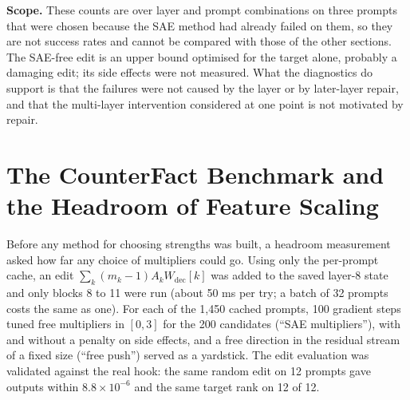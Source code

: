 \documentclass[12pt,a4paper]{report}
\begin{document}
\textbf{Scope.} These counts are over layer and prompt combinations on three prompts that were chosen because the SAE method had already failed on them, so they are not success rates and cannot be compared with those of the other sections. The SAE-free edit is an upper bound optimised for the target alone, probably a damaging edit; its side effects were not measured. What the diagnostics do support is that the failures were not caused by the layer or by later-layer repair, and that the multi-layer intervention considered at one point is not motivated by repair.

\section{The CounterFact Benchmark and the Headroom of Feature Scaling}\label{sec:headroom}

Before any method for choosing strengths was built, a headroom measurement asked how far any choice of multipliers could go. Using only the per-prompt cache, an edit $\sum_k (m_k - 1) A_k W_{\text{dec}}[k]$ was added to the saved layer-8 state and only blocks 8 to 11 were run (about 50 ms per try; a batch of 32 prompts costs the same as one). For each of the 1,450 cached prompts, 100 gradient steps tuned free multipliers in $[0,3]$ for the 200 candidates (``SAE multipliers''), with and without a penalty on side effects, and a free direction in the residual stream of a fixed size (``free push'') served as a yardstick. The edit evaluation was validated against the real hook: the same random edit on 12 prompts gave outputs within $8.8\times10^{-6}$ and the same target rank on 12 of 12.
\end{document}
